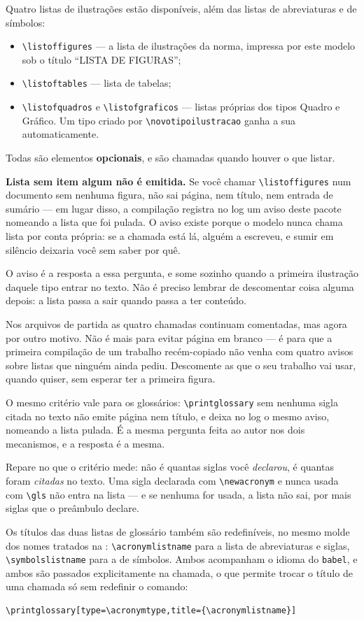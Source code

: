 Quatro listas de ilustrações estão disponíveis, além das listas de abreviaturas e de símbolos:

\begin{itemize}
    \item \verb|\listoffigures| --- a lista de ilustrações da norma, impressa por este modelo
          sob o título ``LISTA DE FIGURAS'';
    \item \verb|\listoftables| --- lista de tabelas;
    \item \verb|\listofquadros| e \verb|\listofgraficos| --- listas próprias dos tipos Quadro e
          Gráfico. Um tipo criado por \verb|\novotipoilustracao| ganha a sua automaticamente.
\end{itemize}

Todas são elementos \textbf{opcionais}, e são chamadas quando houver o que listar.

\textbf{Lista sem item algum não é emitida.} Se você chamar \verb|\listoffigures| num documento sem
nenhuma figura, não sai página, nem título, nem entrada de sumário --- em lugar disso, a compilação
registra no log um aviso deste pacote nomeando a lista que foi pulada. O aviso existe porque o
modelo nunca chama lista por conta própria: se a chamada está lá, alguém a escreveu, e sumir em
silêncio deixaria você sem saber por quê.

O aviso é a resposta a essa pergunta, e some sozinho quando a primeira ilustração daquele tipo
entrar no texto. Não é preciso lembrar de descomentar coisa alguma depois: a lista passa a sair
quando passa a ter conteúdo.

Nos arquivos de partida as quatro chamadas continuam comentadas, mas agora por outro motivo. Não é
mais para evitar página em branco --- é para que a primeira compilação de um trabalho recém-copiado
não venha com quatro avisos sobre listas que ninguém ainda pediu. Descomente as que o seu trabalho
vai usar, quando quiser, sem esperar ter a primeira figura.

O mesmo critério vale para os glossários: \verb|\printglossary| sem nenhuma sigla citada no texto
não emite página nem título, e deixa no log o mesmo aviso, nomeando a lista pulada. É a mesma
pergunta feita ao autor nos dois mecanismos, e a resposta é a mesma.

Repare no que o critério mede: não é quantas siglas você \emph{declarou}, é quantas foram
\emph{citadas} no texto. Uma sigla declarada com \verb|\newacronym| e nunca usada com \verb|\gls|
não entra na lista --- e se nenhuma for usada, a lista não sai, por mais siglas que o preâmbulo
declare.

Os títulos das duas listas de glossário também são redefiníveis, no mesmo molde dos nomes tratados
na : \texttt{\textbackslash acronymlistname} para a lista de
abreviaturas e siglas, \texttt{\textbackslash symbolslistname} para a de símbolos. Ambos
acompanham o idioma do \texttt{babel}, e ambos são passados explicitamente na chamada, o que
permite trocar o título de uma chamada só sem redefinir o comando:

\begin{Verbatim}[fontsize=\small]
\printglossary[type=\acronymtype,title={\acronymlistname}]
\end{Verbatim}
